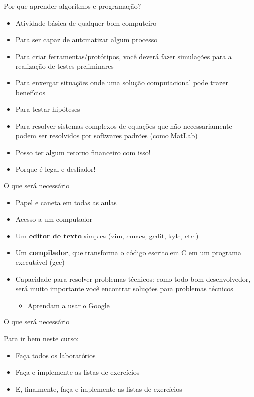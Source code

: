 \documentclass[handout]{beamer}
\begin{document}
\begin{frame}{Por que aprender algoritmos e programação?}

    \begin{itemize}[<+->]
        \item Atividade básica de qualquer bom computeiro
        \item Para ser capaz de automatizar algum processo
        \item Para criar ferramentas/protótipos, você deverá fazer simulações para a realização de testes preliminares
        \item Para enxergar situações onde uma solução computacional pode trazer benefícios
        \item Para testar hipóteses
        \item Para resolver sistemas complexos de equações que não necessariamente podem ser resolvidos por softwares padrões (como MatLab)
        \item Posso ter algum retorno financeiro com isso!
        \item Porque é legal e desfiador!
    \end{itemize}
\end{frame}

\begin{frame}{O que será necessário}

    \begin{itemize}[<+->]
        \item Papel e caneta em todas as aulas
        \item Acesso a um computador
        \item Um {\bf editor de texto} simples (vim, emacs, gedit, kyle, etc.)
        \item Um {\bf compilador}, que transforma o código escrito em C em um programa executável (gcc)
        \item Capacidade para resolver problemas técnicos: como todo bom desenvolvedor, será muito importante você encontrar soluções para problemas técnicos
        \begin{itemize}
            \item Aprendam a usar o Google
        \end{itemize}
    \end{itemize}
\end{frame}

\begin{frame}{O que será necessário}

    Para ir bem neste curso:
    \begin{itemize}[<+->]
        \item Faça todos os laboratórios
        \item Faça e implemente as listas de exercícios
        \item E, finalmente, faça e implemente as listas de exercícios
    \end{itemize}
\end{frame}
\end{document}
